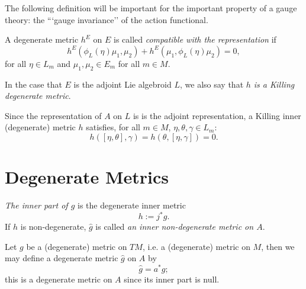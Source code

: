 The following definition will be important for the important property of a gauge theory: the ```gauge invariance'' of the action functional.

\begin{definition}
A degenerate metric $h^E$ on $E$ is called \emph{compatible with the representation} if
\begin{equation*}
    h^E(\phi_L(\eta) \mu_1, \mu_2) + h^E(\mu_1, \phi_L(\eta)\mu_2) = 0,
\end{equation*}
for all $\eta \in L_m$ and $\mu_1, \mu_2 \in E_m$ for all $m \in M$.

In the case that $E$ is the adjoint Lie algebroid $L$, we also say that \emph{$h$ is a Killing degenerate metric}.
\end{definition}

Since the representation of $A$ on $L$ is is the adjoint representation, a Killing inner (degenerate) metric $h$ satisfies, for all $m \in M$, $\eta, \theta, \gamma \in L_m$:
\begin{equation}
    h([\eta, \theta], \gamma) = h(\theta, [\eta, \gamma]) = 0.
\end{equation}

\section{Degenerate Metrics}

\begin{definition}
\emph{The inner part of $\hat g$} is the degenerate inner metric \begin{equation}
    h := j^*g.
\end{equation} If $h$ is non-degenerate, $\hat g$ is called \emph{an inner non-degenerate metric on $A$}.
\end{definition}

Let $g$ be a (degenerate) metric on $TM$, i.e. a (degenerate) metric on $M$, then we may define a degenerate metric $\hat g$ on $A$ by
\begin{equation}
    \hat g = a^* g;
\end{equation}
this is a degenerate metric on $A$ since its inner part is null.

